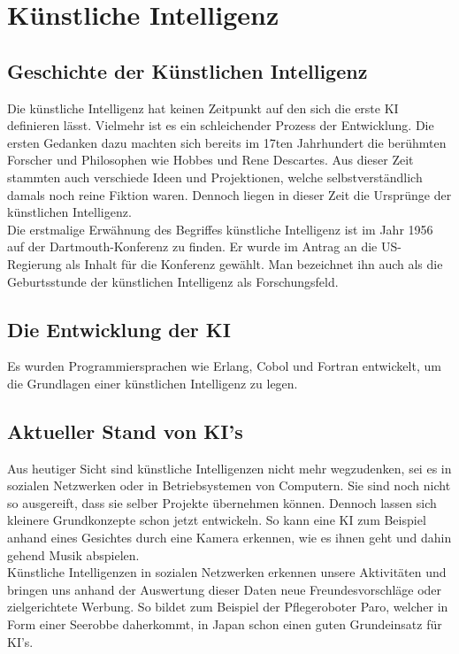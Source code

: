 

\chapter{Künstliche Intelligenz}
\section{Geschichte der Künstlichen Intelligenz}
Die künstliche Intelligenz hat keinen Zeitpunkt auf den sich die erste KI definieren lässt. Vielmehr ist es ein schleichender Prozess der Entwicklung. Die ersten Gedanken dazu machten sich bereits im 17ten Jahrhundert die berühmten Forscher und Philosophen wie Hobbes und Rene Descartes. Aus dieser Zeit stammten auch verschiede Ideen und Projektionen, welche selbstverständlich damals noch reine Fiktion waren. Dennoch liegen in dieser Zeit die Ursprünge der künstlichen Intelligenz. \\
	Die erstmalige Erwähnung des Begriffes \dq künstliche Intelligenz \dq ist im Jahr 1956  auf der Dartmouth-Konferenz zu finden. Er wurde im Antrag an die US-Regierung als Inhalt für die Konferenz gewählt. Man bezeichnet ihn auch als die Geburtsstunde der künstlichen Intelligenz als Forschungsfeld. ~\cite{telekomag2019}

\section{Die Entwicklung der KI}
Es wurden Programmiersprachen wie Erlang, Cobol und Fortran entwickelt, um die Grundlagen einer künstlichen Intelligenz zu legen.  ~\cite{erhardkonrad2000}






\section{Aktueller Stand von KI's}
Aus heutiger Sicht sind künstliche Intelligenzen nicht mehr wegzudenken, sei es in sozialen Netzwerken oder in Betriebsystemen von Computern. Sie sind noch nicht so ausgereift, dass sie selber Projekte übernehmen können. Dennoch lassen sich kleinere Grundkonzepte schon jetzt entwickeln. So kann eine KI zum Beispiel anhand eines Gesichtes durch eine Kamera erkennen, wie es ihnen geht und dahin gehend Musik abspielen. \\
Künstliche Intelligenzen in sozialen Netzwerken erkennen unsere Aktivitäten und bringen uns anhand der Auswertung dieser Daten neue Freundesvorschläge oder zielgerichtete Werbung. So bildet zum Beispiel der Pflegeroboter Paro, welcher in Form einer Seerobbe daherkommt, in Japan schon einen guten Grundeinsatz für KI's.


